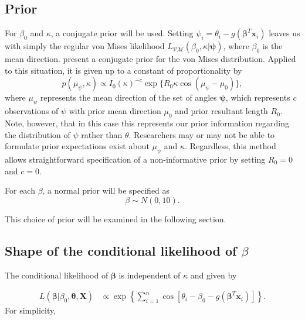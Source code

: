 \documentclass[12pt,a4paper]{article}\usepackage[]{graphicx}\usepackage[]{color}
\begin{document}
\subsection{Prior}

For $\beta_0$ and $\kappa$, a conjugate prior will be used. Setting $\psi_i = \theta_i - g(\boldsymbol\beta^T \boldsymbol{x}_i)$ leaves us with simply the regular von Mises likelihood $L_{\mathcal{VM}}(\beta_0, \kappa \vert \boldsymbol\psi)$, where $\beta_0$ is the mean direction. \citet{guttorp1988finding} present a conjugate prior for the von Mises distribution. Applied to this situation, it is given up to a constant of proportionality by
\begin{equation}
p(\mu_{\psi}, \kappa) \propto  I_0 (\kappa) ^{-c} \exp\{R_0 \kappa \cos (\mu_{\psi} - \mu_0)\},
\end{equation}
where $\mu_{\psi}$ represents the mean direction of the set of angles $\boldsymbol\psi$,  which represents $c$ observations of $\psi$ with prior mean direction $\mu_0$ and prior resultant length $R_0$. Note, however, that in this case this represents our prior information regarding the distribution of $\psi$ rather than $\theta$. Researchers may or may not be able to formulate prior expectations exist about $\mu_{\psi}$ and $\kappa$. Regardless, this method allows straightforward specification of a non-informative prior by setting $R_0 = 0$ and $c = 0$.

For each $\beta$, a normal prior will be specified as
\begin{equation}
\beta \sim N(0, 10).
\end{equation}

This choice of prior will be examined in the following section.

\subsection{Shape of the conditional likelihood of $\beta$}



The conditional likelihood of $\boldsymbol{\beta}$ is independent of $\kappa$ and given by

\begin{align}
L(\boldsymbol{\beta} \vert \beta_0, \boldsymbol{\theta}, \boldsymbol{X}) &\propto
\exp \left\lbrace \sum_{i=1}^{n} \cos \left[ \theta_i - \beta_0 - g(\boldsymbol\beta^T \boldsymbol{x}_i) \right]  \right\rbrace.
\end{align}
For simplicity,
\end{document}
